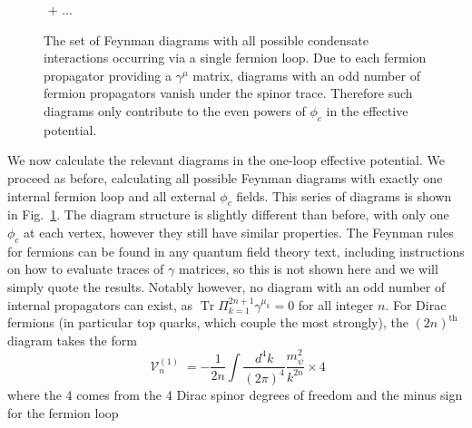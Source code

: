 \documentclass[%
 reprint,
nofootinbib,
 amsmath,amssymb,
 aps,
floatfix,
]{revtex4-1}
\DeclareMathOperator{\V}{\mathcal{V}}
\DeclareMathOperator{\Tr}{Tr}
\begin{document}
\begin{figure}
    \,\,+\,\,...
    \caption{The set of Feynman diagrams with all possible condensate interactions occurring via a single fermion loop. Due to each fermion propagator providing a $\gamma^\mu$ matrix, diagrams with an odd number of fermion propagators vanish under the spinor trace. Therefore such diagrams only contribute to the even powers of $\phi_c$ in the effective potential.}
    \label{fig:fermionloops}
\end{figure}
We now calculate the relevant diagrams in the one-loop effective potential.
We proceed as before, calculating all possible Feynman diagrams with exactly one internal fermion loop and all external $\phi_c$ fields.
This series of diagrams is shown in Fig.~\ref{fig:fermionloops}.
The diagram structure is slightly different than before, with only one $\phi_c$ at each vertex, however they still have similar properties.
The Feynman rules for fermions can be found in any quantum field theory text, including instructions on how to evaluate traces of $\gamma$ matrices, so this is not shown here and we will simply quote the results.
Notably however, no diagram with an odd number of internal propagators can exist, as $\Tr \Pi_{k=1}^{2n+1} \gamma^{\mu_k} = 0$ for all integer $n$.
For Dirac fermions (in particular top quarks, which couple the most strongly), the $(2n)^\text{th}$ diagram takes the form \cite{quiros99}
\begin{equation}
    \V^{(1)}_n = -\frac{1}{2n}\int \frac{d^4k}{(2\pi)^4} \frac{m_\psi^2}{k^{2n}} \times 4
\end{equation}
where the 4 comes from the 4 Dirac spinor degrees of freedom and the minus sign for the fermion loop
\end{document}
